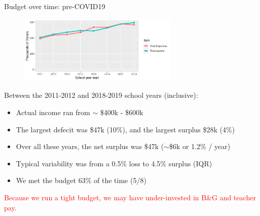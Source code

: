 \documentclass[8pt]{beamer}
\begin{document}

\begin{frame}{Budget over time: pre-COVID19}
\begin{figure}
\begin{center}
\includegraphics[width=3in]{budget_history.png}
\end{center}
\end{figure}

Between the 2011-2012 and 2018-2019 school years (inclusive):
%
\begin{itemize}
%
\item Actual income ran from $\sim$ \$400k - \$600k
\item The largest defecit was \$47k (10\%), and the largest surplus \$28k (4\%)
\item Over all these years, the net surplus was \$47k ($\sim$\$6k or 1.2\% / year)
\item Typical variability was from a 0.5\% loss to 4.5\% surplus (IQR)
\item We met the budget 63\% of the time (5/8)
%
\end{itemize}
%
\textcolor{red}{Because we run a tight budget, we may have
under-invested in B\&G and teacher pay.}

\end{frame}


\end{document}
